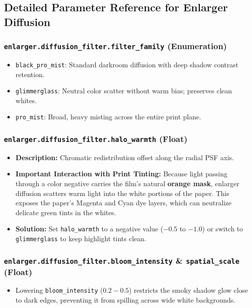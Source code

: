 \documentclass[11pt,a4paper]{article}
\begin{document}
\subsection{Detailed Parameter Reference for Enlarger Diffusion}

\subsubsection{\texttt{enlarger.diffusion\_filter.filter\_family} (Enumeration)}
\begin{itemize}[leftmargin=*]
    \item \texttt{black\_pro\_mist}: Standard darkroom diffusion with deep shadow contrast retention.
    \item \texttt{glimmerglass}: Neutral color scatter without warm bias; preserves clean whites.
    \item \texttt{pro\_mist}: Broad, heavy misting across the entire print plane.
\end{itemize}

\subsubsection{\texttt{enlarger.diffusion\_filter.halo\_warmth} (Float)}
\begin{itemize}[leftmargin=*]
    \item \textbf{Description:} Chromatic redistribution offset along the radial PSF axis.
    \item \textbf{Important Interaction with Print Tinting:}
    Because light passing through a color negative carries the film's natural \textbf{orange mask}, enlarger diffusion scatters warm light into the white portions of the paper. This exposes the paper's Magenta and Cyan dye layers, which can neutralize delicate green tints in the whites.
    \item \textbf{Solution:} Set \texttt{halo\_warmth} to a negative value ($-0.5$ to $-1.0$) or switch to \texttt{glimmerglass} to keep highlight tints clean.
\end{itemize}

\subsubsection{\texttt{enlarger.diffusion\_filter.bloom\_intensity} \& \texttt{spatial\_scale} (Float)}
\begin{itemize}[leftmargin=*]
    \item Lowering \texttt{bloom\_intensity} ($0.2 - 0.5$) restricts the smoky shadow glow close to dark edges, preventing it from spilling across wide white backgrounds.
\end{itemize}
\end{document}
